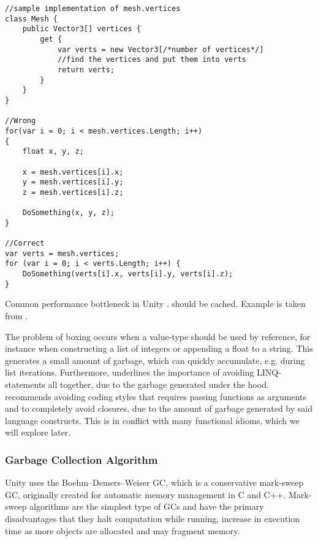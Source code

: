 \begin{listing}
\begin{verbatim}
//sample implementation of mesh.vertices
class Mesh {
    public Vector3[] vertices {
        get {
            var verts = new Vector3[/*number of vertices*/]
            //find the vertices and put them into verts
            return verts;
        }
    }
}

//Wrong
for(var i = 0; i < mesh.vertices.Length; i++)
{
    float x, y, z;

    x = mesh.vertices[i].x;
    y = mesh.vertices[i].y;
    z = mesh.vertices[i].z;

    DoSomething(x, y, z);
}

//Correct
var verts = mesh.vertices;
for (var i = 0; i < verts.Length; i++) {
    DoSomething(verts[i].x, verts[i].y, verts[i].z);
}
\end{verbatim}
\caption{Common performance bottleneck in Unity \cite{unity:heap}.  should be cached. Example is taken from \cite{unity:heap}.} \label{lst:unity:array:prop}
\end{listing}

The problem of boxing occurs when a value-type should be used by reference, for instance when constructing a list of integers or appending a float to a string. This generates a small amount of garbage, which can quickly accumulate, e.g. during list iterations. Furthermore, \cite{unity:optimisation} underlines the importance of avoiding \gls{LINQ}-statements all together, due to the garbage generated under the hood. \cite{unity:heap} recommends avoiding coding styles that requires passing functions as arguments and to completely avoid closures, due to the amount of garbage generated by said language constructs. This is in conflict with many functional idioms, which we will explore later.

\subsubsection{Garbage Collection Algorithm}\label{sec:gc-strat}
Unity uses the Boehm–Demers–Weiser \gls{GC}, which is a conservative mark-sweep \gls{GC}\cite{unity:heap}, originally created for automatic memory management in C and C++\cite{boehm2007transparent}. Mark-sweep algorithms are the simplest type of \glspl{GC} and have the primary disadvantages that they halt computation while running, increase in execution time as more objects are allocated and may fragment memory\cite{sestoft2017programming}.

